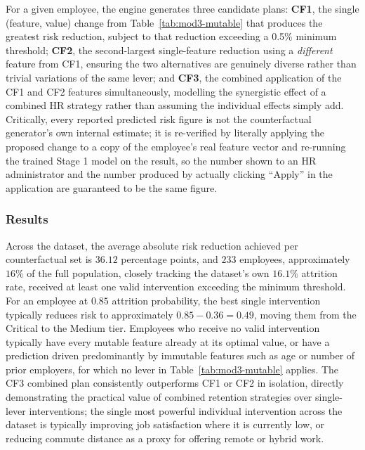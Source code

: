 \documentclass[11pt,a4paper]{article}
\begin{document}
For a given employee, the engine generates three candidate plans: \textbf{CF1}, the single (feature, value) change from Table~\ref{tab:mod3-mutable} that produces the greatest risk reduction, subject to that reduction exceeding a 0.5\% minimum threshold; \textbf{CF2}, the second-largest single-feature reduction using a \emph{different} feature from CF1, ensuring the two alternatives are genuinely diverse rather than trivial variations of the same lever; and \textbf{CF3}, the combined application of the CF1 and CF2 features simultaneously, modelling the synergistic effect of a combined HR strategy rather than assuming the individual effects simply add. Critically, every reported predicted risk figure is not the counterfactual generator's own internal estimate; it is re-verified by literally applying the proposed change to a copy of the employee's real feature vector and re-running the trained Stage 1 model on the result, so the number shown to an HR administrator and the number produced by actually clicking ``Apply'' in the application are guaranteed to be the same figure.

\subsubsection{Results}

Across the dataset, the average absolute risk reduction achieved per counterfactual set is $36.12$ percentage points, and $233$ employees, approximately $16\%$ of the full population, closely tracking the dataset's own $16.1\%$ attrition rate, received at least one valid intervention exceeding the minimum threshold. For an employee at $0.85$ attrition probability, the best single intervention typically reduces risk to approximately $0.85 - 0.36 = 0.49$, moving them from the Critical to the Medium tier. Employees who receive no valid intervention typically have every mutable feature already at its optimal value, or have a prediction driven predominantly by immutable features such as age or number of prior employers, for which no lever in Table~\ref{tab:mod3-mutable} applies. The CF3 combined plan consistently outperforms CF1 or CF2 in isolation, directly demonstrating the practical value of combined retention strategies over single-lever interventions; the single most powerful individual intervention across the dataset is typically improving job satisfaction where it is currently low, or reducing commute distance as a proxy for offering remote or hybrid work.
\end{document}
